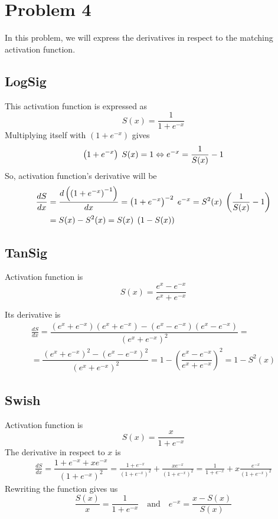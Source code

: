 \section{Problem 4}

In this problem, we will express the derivatives in respect to the matching activation function.

\subsection{LogSig}

This activation function is expressed as
\[
S(x) = \dfrac{1}{1 + e^{-x}}
\]
Multiplying itself with $\left(1 + e^{-x}\right)$ gives
\[
\left(1 + e^{-x}\right) \hspace{1mm} S(x) = 1 \Leftrightarrow e^{-x} = \frac{1}{S(x)} - 1
\]
So, activation function's derivative will be
\[
\begin{aligned}[c]
\dfrac{dS}{dx} &= \dfrac{d\left(\left(1+e^{-x}\right)^{-1}\right)}{dx} = \left(1+e^{-x}\right)^{-2} \hspace{1mm} e^{-x} = S^2(x) \hspace{1mm} \left(\dfrac{1}{S(x)} -1 \right) \\
&= S(x) - S^2(x) = S(x) \hspace{1mm} \left( 1 - S(x) \right)
\end{aligned}
\]

\subsection{TanSig}

Activation function is 
\[
S(x) = \dfrac{e^x - e^{-x}}{e^x + e^{-x}}
\]

Its derivative is 
\begin{equation}
\begin{gathered}
\frac{dS}{dx} = \dfrac{\left(e^x +e^{-x} \right)\left(e^x +e^{-x} \right) - \left(e^x - e^{-x} \right)\left(e^x - e^{-x} \right)}{\left(e^x + e^{-x} \right)^2} = \\
= \dfrac{\left( e^x + e^{-x} \right)^2 - \left( e^x - e^{-x} \right)^2}{\left( e^x + e^{-x} \right)^2} = 1- \left(\dfrac{e^x - e^{-x}}{e^x + e^{-x}}\right)^2 = 1 - S^2(x)
\end{gathered}
\end{equation}

\subsection{Swish}

Activation function is
\[
S(x) = \dfrac{x}{1 + e^{-x}}
\]
The derivative in respect to $x$ is 
\[
\begin{gathered}
\frac{dS}{dx} = \dfrac{1 + e^{-x} + x e^{-x}}{\left( 1 + e^{-x} \right)^2} = \frac{1 + e^{-x}}{\left( 1 + e^{-x} \right)^2} + \frac{xe^{-x}}{\left( 1 + e^{-x} \right)^2} = \frac{1}{1+e^{-x}} + x \frac{e^{-x}}{\left( 1 + e^{-x} \right)^2}
\end{gathered}
\]
Rewriting the function gives us
\[
\frac{S(x)}{x} = \frac{1}{1 + e^{-x}} \quad \text{and} \quad e^{-x} = \frac{x-S(x)}{S(x)}
\]

